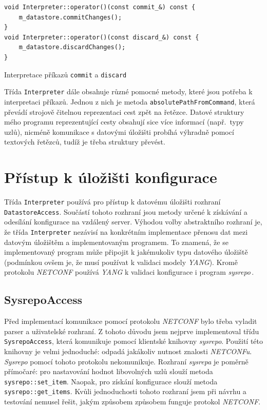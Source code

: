 \documentclass[thesis=B,czech,hidelinks]{FITthesis}[2019/03/06]
\begin{document}
\begin{listing}
\begin{verbatim}
void Interpreter::operator()(const commit_&) const {
    m_datastore.commitChanges();
}
void Interpreter::operator()(const discard_&) const {
    m_datastore.discardChanges();
}
\end{verbatim}
\caption{Interpretace příkazů \texttt{commit} a \texttt{discard}}\label{interpreter:commit:discard}
\end{listing}

Třída \texttt{Interpreter} dále obsahuje různé pomocné metody, které jsou potřeba k interpretaci příkazů. Jednou z nich je metoda \texttt{absolutePathFromCommand}, která převádí strojově čitelnou reprezentaci cest zpět na řetězce. Datové struktury mého programu reprezentující cesty obsahují sice více informací (např.\ typy uzlů), nicméně komunikace s datovými úložišti probíhá výhradně pomocí textových řetězců, tudíž je třeba struktury převést.


\section{Přístup k úložišti konfigurace}\label{datastore:access}
Třída \texttt{Interpreter} používá pro přístup k datovému úložišti rozhraní \texttt{DatastoreAccess}. Součástí tohoto rozhraní jsou metody určené k získávání a odesílání konfigurace na vzdálený server. Výhodou volby abstraktního rozhraní je, že třída \texttt{Interpreter} nezávisí na konkrétním implementace přenosu dat mezi datovým úložištěm a implementovaným programem. To znamená, že se implementovaný program může připojit k jakémukoliv typu datového úložiště (podmínkou ovšem je, že musí používat k validaci modely \textit{YANG}). Kromě protokolu \textit{NETCONF} používá \textit{YANG} k validaci konfigurace i program \textit{sysrepo}\,\cite{sysrepo}.

\subsection{SysrepoAccess}
Před implementací komunikace pomocí protokolu \textit{NETCONF} bylo třeba vyladit parser a uživatelské rozhraní. Z tohoto důvodu jsem nejprve implementoval třídu \texttt{SysrepoAccess}, která komunikuje pomocí klientské knihovny \textit{sysrepo}. Použití této knihovny je velmi jednoduché: odpadá jakákoliv nutnost znalosti \textit{NETCONFu}. \textit{Sysrepo} pomocí tohoto protokolu nekomunikuje. Rozhraní \textit{sysrepa} je poměrně přímočaré: pro nastavování hodnot libovolných uzlů slouží metoda \texttt{sysrepo::set\_item}. Naopak, pro získání konfigurace slouží metoda \texttt{sysrepo::get\_items}. Kvůli jednoduchosti tohoto rozhraní jsem při návrhu a testování nemusel řešit, jakým způsobem způsobem funguje protokol \textit{NETCONF}.
\end{document}

